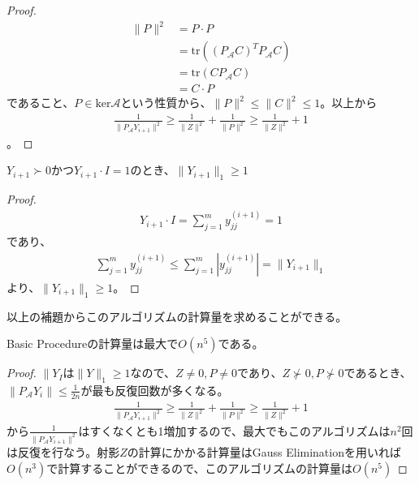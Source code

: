 \begin{proof}
\begin{align*}
    \|P\|^2 & = P \cdot P \\
            & = \mathrm{tr}((P_\mathcal{A} C)^T P_\mathcal{A} C)\\
            & = \mathrm{tr}(C P_\mathcal{A} C) \\
            & = C \cdot P
  \end{align*}
  であること、$P \in \mathrm{ker} \mathcal{A}$という性質から、$\|P\|^2 \leq \|C\|^2 \leq 1$。以上から
  \begin{align*}
    \frac{1}{\|P_\mathcal{A} Y_{i + 1}\|^2} \geq \frac{1}{\|Z\|^2} + \frac{1}{\|P\|^2} \geq \frac{1}{\|Z\|^2} + 1
  \end{align*}
  。
\end{proof}

\begin{lemma*}
  $Y_{i + 1} \succ 0$かつ$Y_{i + 1} \cdot I = 1$のとき、$\|Y_{i + 1}\|_1 \geq 1$
\end{lemma*}
\begin{proof}
  \begin{align*}
    Y_{i + 1} \cdot I = \displaystyle{\sum_{j = 1}^m y_{j j}^{(i + 1)}} = 1
  \end{align*}
  であり、
  \begin{align*}
    \displaystyle{\sum_{j = 1}^m y_{j j}^{(i + 1)}} \leq \displaystyle{\sum_{j = 1}^m |y_{j j}^{(i + 1)}|} = \|Y_{i + 1}\|_1
  \end{align*}
  より、$\|Y_{i + 1}\|_1 \geq 1$。
\end{proof}

以上の補題からこのアルゴリズムの計算量を求めることができる。
\begin{theorem} \label{BasicProcedureOrder}
  Basic Procedureの計算量は最大で$O (n^5)$である。
\end{theorem}
\begin{proof}
  $\|Y_I$は$\|Y\|_1 \geq 1$なので、$Z \not= 0, P \not= 0$であり、$Z \not\succ 0, P \not\succ 0$であるとき、$\|P_\mathcal{A} Y_i\| \leq \displaystyle{\frac{1}{2 n}}$が最も反復回数が多くなる。
  \begin{align*}
    \frac{1}{\|P_\mathcal{A} Y_{i + 1}\|^2} \geq \frac{1}{\|Z\|^2} + \frac{1}{\|P\|^2} \geq \frac{1}{\|Z\|^2} + 1
  \end{align*}
  から$\displaystyle{\frac{1}{\|P_\mathcal{A} Y_{i + 1}\|^2}}$はすくなくとも1増加するので、最大でもこのアルゴリズムは$n^2$回は反復を行なう。射影$Z$の計算にかかる計算量はGauss Eliminationを用いれば$O (n^3)$で計算することができるので、このアルゴリズムの計算量は$O(n^5)$
\end{proof}

